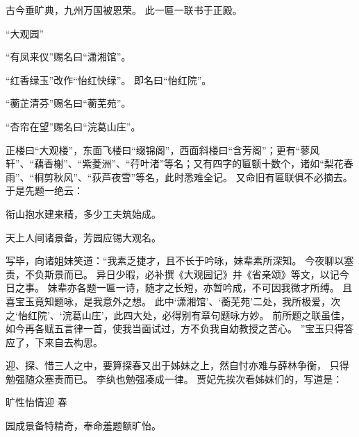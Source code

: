 古今垂旷典，九州万国被恩荣。
{\footnotesize 此一匾一联书于正殿。
}\par
“大观园”\par
“有凤来仪”赐名曰“潇湘馆”。
\par
“红香绿玉”改作“怡红快绿”。
即名曰“怡红院”。
\par
“蘅芷清芬”赐名曰“蘅芜苑”。
\par
“杏帘在望”赐名曰“浣葛山庄”。
\par
\hop
正楼曰“大观楼”，东面飞楼曰“缀锦阁”，西面斜楼曰“含芳阁”；更有“蓼风轩”、“藕香榭”、“紫菱洲”、“荇叶渚”等名；又有四字的匾额十数个，诸如“梨花春雨”、“桐剪秋风”、“荻芦夜雪”等名，此时悉难全记。
又命旧有匾联俱不必摘去。
于是先题一绝云：\par
\hop
衔山抱水建来精，多少工夫筑始成。
\par
天上人间诸景备，芳园应锡大观名。
\par	
\hop
写毕，向诸姐妹笑道：“我素乏捷才，且不长于吟咏，妹辈素所深知。
今夜聊以塞责，不负斯景而已。
异日少暇，必补撰《大观园记》并《省亲颂》等文，以记今日之事。
妹辈亦各题一匾一诗，随才之长短，亦暂吟成，不可因我微才所缚。
且喜宝玉竟知题咏，是我意外之想。
此中‘潇湘馆’、‘蘅芜苑’二处，我所极爱，次之‘怡红院’、‘浣葛山庄’，此四大处，必得别有章句题咏方妙。
前所题之联虽佳，如今再各赋五言律一首，使我当面试过，方不负我自幼教授之苦心。
”宝玉只得答应了，下来自去构思。
\par
迎、探、惜三人之中，要算探春又出于姊妹之上，然自忖亦难与薛林争衡，
只得勉强随众塞责而已。
李纨也勉强凑成一律。
贾妃先挨次看姊妹们的，写道是：\par
\hop
旷性怡情\quad 迎 春\par
园成景备特精奇，奉命羞题额旷怡。
\par
